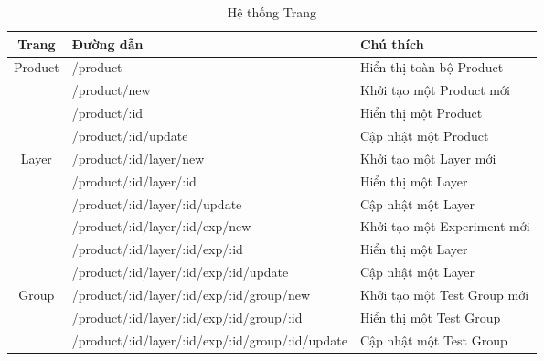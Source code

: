 \begin{table}[H]
	\centering
	\begin{tabular}{|c|l|p{5cm}|}
		\hline
		Trang                    & Đường dẫn                                       & Chú thích                   \\ \hline
		\multirow{4}{*}{Product} & /product                                        & Hiển thị toàn bộ Product    \\ \cline{2-3}
		                         & /product/new                                    & Khởi tạo một Product mới    \\ \cline{2-3}
		                         & /product/:id                                    & Hiển thị một Product        \\ \cline{2-3}
		                         & /product/:id/update                             & Cập nhật một Product        \\ \hline
		\multirow{4}{*}{Layer}
		                         & /product/:id/layer/new                          & Khởi tạo một Layer mới      \\ \cline{2-3}
		                         & /product/:id/layer/:id                          & Hiển thị một Layer          \\ \cline{2-3}
		                         & /product/:id/layer/:id/update                   & Cập nhật một Layer          \\ \hline
		\multirow{4}{*}{Experiment}
		                         & /product/:id/layer/:id/exp/new                  & Khởi tạo một Experiment mới \\ \cline{2-3}
		                         & /product/:id/layer/:id/exp/:id                  & Hiển thị một Layer          \\ \cline{2-3}
		                         & /product/:id/layer/:id/exp/:id/update           & Cập nhật một Layer          \\ \hline
		\multirow{4}{*}{Group}
		                         & /product/:id/layer/:id/exp/:id/group/new        & Khởi tạo một Test Group mới \\ \cline{2-3}
		                         & /product/:id/layer/:id/exp/:id/group/:id        & Hiển thị một Test Group     \\ \cline{2-3}
		                         & /product/:id/layer/:id/exp/:id/group/:id/update & Cập nhật một Test Group     \\ \hline
	\end{tabular}
	\caption{Hệ thống Trang}
\end{table}

